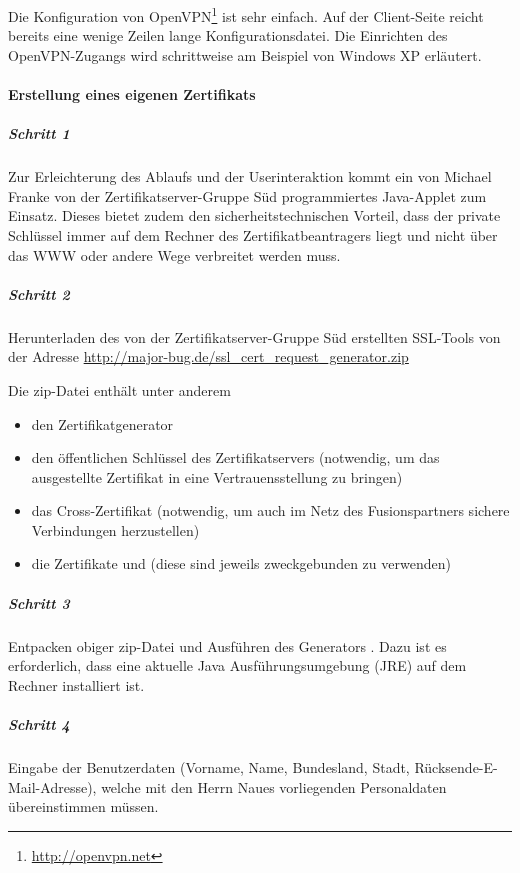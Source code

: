Die Konfiguration von OpenVPN\footnote{\url{http://openvpn.net}} ist sehr
einfach. Auf der Client-Seite reicht bereits eine wenige Zeilen lange
Konfigurationsdatei. Die Einrichten des OpenVPN\hyp Zugangs wird schrittweise am
Beispiel von Windows XP erläutert.

\paragraph{Erstellung eines eigenen Zertifikats}

\subparagraph{Schritt 1}
Zur Erleichterung des Ablaufs und der Userinteraktion kommt ein von Michael
Franke von der Zertifikatserver-Gruppe Süd programmiertes Java-Applet zum
Einsatz. Dieses bietet zudem den sicherheitstechnischen Vorteil, dass der
private Schlüssel immer auf dem Rechner des Zertifikatbeantragers liegt und
nicht über das WWW oder andere Wege verbreitet werden muss.


\subparagraph{Schritt 2}
Herunterladen des von der Zertifikatserver-Gruppe Süd erstellten SSL-Tools von der
Adresse \url{http://major-bug.de/ssl_cert_request_generator.zip}

Die zip-Datei enthält unter anderem

\begin{itemize}
  \item den Zertifikatgenerator
  \item den öffentlichen Schlüssel  des
    Zertifikatservers (notwendig, um das ausgestellte Zertifikat in eine
    Vertrauensstellung zu bringen)
  \item das Cross-Zertifikat  (notwendig, um
    auch im Netz des Fusionspartners sichere Verbindungen herzustellen)
  \item die Zertifikate  und
      (diese sind jeweils zweckgebunden zu
    verwenden)
\end{itemize}

\subparagraph{Schritt 3}

Entpacken obiger zip-Datei und Ausführen des Generators
.  Dazu ist es erforderlich, dass eine
aktuelle Java Ausführungsumgebung (JRE) auf dem Rechner installiert ist.

\subparagraph{Schritt 4}

Eingabe der Benutzerdaten (Vorname, Name, Bundesland, Stadt,
Rücksende-E-Mail-Adresse), welche mit den Herrn Naues vorliegenden Personaldaten
übereinstimmen müssen.

